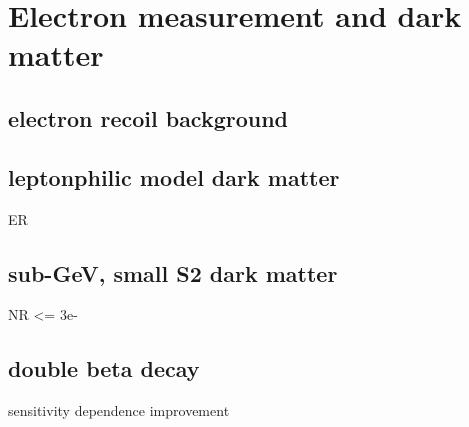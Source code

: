 \chapter{Electron measurement and dark matter}
\section{electron recoil background}
\section{leptonphilic model dark matter}
ER
\section{sub-GeV, small S2 dark matter }
NR <= 3e-
\section{double beta decay}
sensitivity dependence improvement










